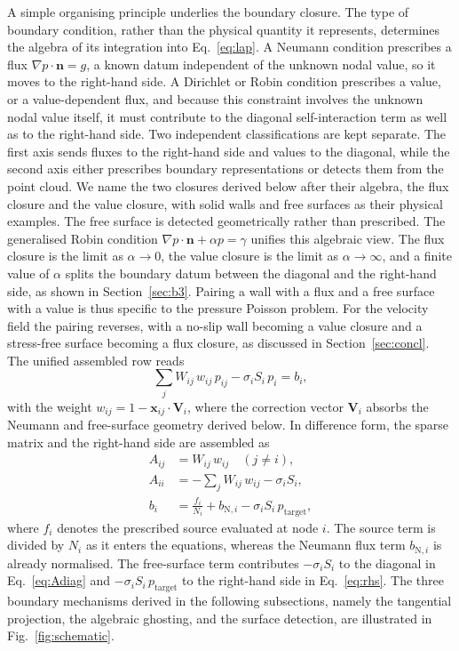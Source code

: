 \documentclass[preprint,review,12pt]{elsarticle}
\newcommand{\xij}{\mathbf{x}_{ij}}
\newcommand{\Vi}{\mathbf{V}_i}
\begin{document}
A simple organising principle underlies the boundary closure.
The type of boundary condition, rather than the physical quantity it represents, determines the algebra of its integration into Eq.~\eqref{eq:lap}.
A Neumann condition prescribes a flux $\nabla p\cdot\mathbf n=g$, a known datum independent of the unknown nodal value, so it moves to the right-hand side.
A Dirichlet or Robin condition prescribes a value, or a value-dependent flux, and because this constraint involves the unknown nodal value itself, it must contribute to the diagonal self-interaction term as well as to the right-hand side.
Two independent classifications are kept separate.
The first axis sends fluxes to the right-hand side and values to the diagonal, while the second axis either prescribes boundary representations or detects them from the point cloud.
We name the two closures derived below after their algebra, the flux closure and the value closure, with solid walls and free surfaces as their physical examples.
The free surface is detected geometrically rather than prescribed.
The generalised Robin condition $\nabla p\cdot\mathbf n+\alpha p=\gamma$ unifies this algebraic view.
The flux closure is the limit as $\alpha\to0$, the value closure is the limit as $\alpha\to\infty$, and a finite value of $\alpha$ splits the boundary datum between the diagonal and the right-hand side, as shown in Section~\ref{sec:b3}.
Pairing a wall with a flux and a free surface with a value is thus specific to the pressure Poisson problem.
For the velocity field the pairing reverses, with a no-slip wall becoming a value closure and a stress-free surface becoming a flux closure, as discussed in Section~\ref{sec:concl}.
The unified assembled row reads
\begin{equation}
  \sum_j W_{ij}\,w_{ij}\,p_{ij}-\sigma_i S_i\,p_i=b_i,
  \label{eq:row}
\end{equation}
with the weight $w_{ij}=1-\xij\cdot\Vi$, where the correction vector $\Vi$ absorbs the Neumann and free-surface geometry derived below.
In difference form, the sparse matrix and the right-hand side are assembled as
\begin{align}
  A_{ij} &= W_{ij}\,w_{ij}\quad(j\neq i), \label{eq:Aoff}\\
  A_{ii} &= -\sum_{j} W_{ij}\,w_{ij}-\sigma_i S_i, \label{eq:Adiag}\\
  b_i &= \frac{f_i}{N_i}+b_{\mathrm{N},i}-\sigma_i S_i\,p_{\mathrm{target}}, \label{eq:rhs}
\end{align}
where $f_i$ denotes the prescribed source evaluated at node $i$.
The source term is divided by $N_i$ as it enters the equations, whereas the Neumann flux term $b_{\mathrm{N},i}$ is already normalised.
The free-surface term contributes $-\sigma_i S_i$ to the diagonal in Eq.~\eqref{eq:Adiag} and $-\sigma_i S_i\,p_{\mathrm{target}}$ to the right-hand side in Eq.~\eqref{eq:rhs}.
The three boundary mechanisms derived in the following subsections, namely the tangential projection, the algebraic ghosting, and the surface detection, are illustrated in Fig.~\ref{fig:schematic}.
\end{document}
